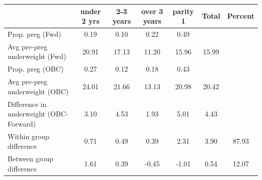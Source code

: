 \begin{tabular}{l*{6}{c}}
\toprule
            &\multicolumn{1}{c}{under 2 yrs}&\multicolumn{1}{c}{2-3 years}&\multicolumn{1}{c}{over 3 years}&\multicolumn{1}{c}{parity 1}&\multicolumn{1}{c}{Total}&\multicolumn{1}{c}{Percent}\\
\midrule
\midrule
Prop. preg (Fwd)&        0.19&        0.10&        0.22&        0.49&            &            \\
Avg pre-preg underweight (Fwd)&       20.91&       17.13&       11.20&       15.96&       15.99&            \\
Prop. preg (OBC)&        0.27&        0.12&        0.18&        0.43&            &            \\
Avg pre-preg underweight (OBC)&       24.01&       21.66&       13.13&       20.98&       20.42&            \\
Difference in underweight (OBC-Forward)&        3.10&        4.53&        1.93&        5.01&        4.43&            \\
Within group difference&        0.71&        0.49&        0.39&        2.31&        3.90&       87.93\\
Between group difference&        1.61&        0.39&       -0.45&       -1.01&        0.54&       12.07\\
\bottomrule
\end{tabular}
